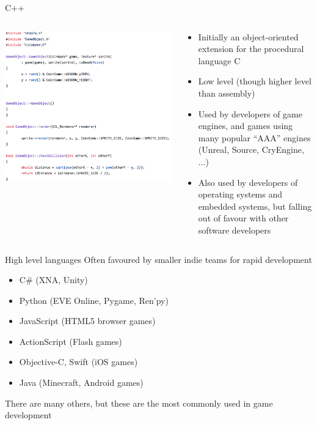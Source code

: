 \begin{frame}{C++}
	\begin{columns}
		\begin{column}{0.4\textwidth}
			\includegraphics[width=\textwidth]{cplusplus}
		\end{column}
		\begin{column}{0.58\textwidth}
			\begin{itemize}
				\pause\item Initially an object-oriented extension for the procedural language C
				\pause\item Low level (though higher level than assembly)
				\pause\item Used by developers of game engines,
					and games using many popular ``AAA'' engines (Unreal, Source, CryEngine, ...)
				\pause\item Also used by developers of operating systems and embedded systems,
					but falling out of favour with other software developers
			\end{itemize}
		\end{column}
	\end{columns}
\end{frame}

\begin{frame}{High level languages}
	\pause Often favoured by smaller indie teams for rapid development
	\begin{itemize}
		\pause\item C\# (XNA, Unity)
		\pause\item Python (EVE Online, Pygame, Ren'py)
		\pause\item JavaScript (HTML5 browser games)
		\pause\item ActionScript (Flash games)
		\pause\item Objective-C, Swift (iOS games)
		\pause\item Java (Minecraft, Android games)
	\end{itemize}
	\pause There are many others, but these are the most commonly used in game development
\end{frame}

